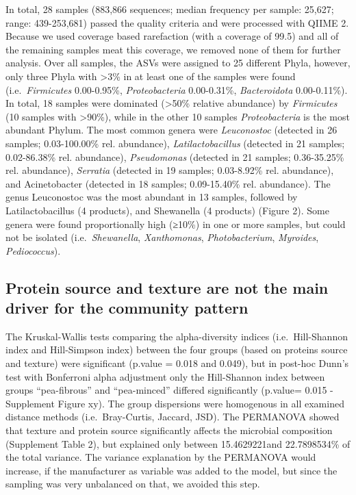 \documentclass[preprint, 3p,
authoryear]{elsarticle} %
\begin{document}
In total, 28 samples (883,866 sequences; median frequency per sample:
25,627; range: 439-253,681) passed the quality criteria and were
processed with QIIME 2. Because we used coverage based rarefaction (with
a coverage of 99.5) and all of the remaining samples meat this coverage,
we removed none of them for further analysis. Over all samples, the ASVs
were assigned to 25 different Phyla, however, only three Phyla with
\textgreater3\% in at least one of the samples were found
(i.e.~\emph{Firmicutes} 0.00-0.95\%, \emph{Proteobacteria} 0.00-0.31\%,
\emph{Bacteroidota} 0.00-0.11\%). In total, 18 samples were dominated
(\textgreater50\% relative abundance) by \emph{Firmicutes} (10 samples
with \textgreater90\%), while in the other 10 samples
\emph{Proteobacteria} is the most abundant Phylum. The most common
genera were \emph{Leuconostoc} (detected in 26 samples; 0.03-100.00\%
rel. abundance), \emph{Latilactobacillus} (detected in 21 samples;
0.02-86.38\% rel. abundance), \emph{Pseudomonas} (detected in 21
samples; 0.36-35.25\% rel. abundance), \emph{Serratia} (detected in 19
samples; 0.03-8.92\% rel. abundance), and Acinetobacter (detected in 18
samples; 0.09-15.40\% rel. abundance). The genus Leuconostoc was the
most abundant in 13 samples, followed by Latilactobacillus (4 products),
and Shewanella (4 products) (Figure 2). Some genera were found
proportionally high (≥10\%) in one or more samples, but could not be
isolated (i.e.~\emph{Shewanella}, \emph{Xanthomonas},
\emph{Photobacterium}, \emph{Myroides}, \emph{Pediococcus}).

\hypertarget{protein-source-and-texture-are-not-the-main-driver-for-the-community-pattern}{%
\subsection{Protein source and texture are not the main driver for the
community
pattern}\label{protein-source-and-texture-are-not-the-main-driver-for-the-community-pattern}}

The Kruskal-Wallis tests comparing the alpha-diversity indices
(i.e.~Hill-Shannon index and Hill-Simpson index) between the four groups
(based on proteins source and texture) were significant (p.value = 0.018
and 0.049), but in post-hoc Dunn's test with Bonferroni alpha adjustment
only the Hill-Shannon index between groups ``pea-fibrous'' and
``pea-minced'' differed significantly (p.value= 0.015 - Supplement
Figure xy). The group dispersions were homogenous in all examined
distance methods (i.e.~Bray-Curtis, Jaccard, JSD). The PERMANOVA showed
that texture and protein source significantly affects the microbial
composition (Supplement Table 2), but explained only between
15.4629221and 22.7898534\% of the total variance. The variance
explanation by the PERMANOVA would increase, if the manufacturer as
variable was added to the model, but since the sampling was very
unbalanced on that, we avoided this step.
\end{document}
